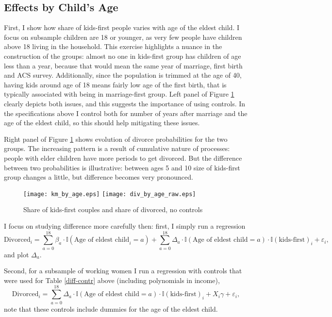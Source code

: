 \documentclass[12pt,letter]{article}
\newcommand{\I}{\mathbb{I}}
\begin{document}
\subsection{Effects by Child's Age}
First, I show how share of kids-first people varies with age of the eldest child. I focus on subsample children are 18 or younger, as very few people have children above 18 living in the household. This exercise highlights a nuance in the construction of the groups: almost no one in kids-first group has children of age less than a year, because that would mean the same year of marriage, first birth and ACS survey. Additionally, since the population is trimmed at the age of 40, having kids around age of 18 means fairly low age of the first birth, that is typically associated with being in marriage-first group. Left panel of Figure \ref{pics-raw} clearly depicts both issues, and this suggests the importance of using controls. In the specifications above I control both for number of years after marriage and the age of the eldest child, so this should help mitigating these issues.

Right panel of Figure \ref{pics-raw} shows evolution of divorce probabilities for the two groups. The increasing pattern is a result of cumulative nature of processes: people with elder children have more periods to get divorced. But the difference between two probabilities is illustrative: between ages 5 and 10 size of kids-first group changes a little, but difference becomes very pronounced.

\begin{figure}[h!]
\texttt{[image: km\_by\_age.eps]}
\texttt{[image: div\_by\_age\_raw.eps]}
\caption{Share of kids-first couples and share of divorced, no controls\label{pics-raw}}
\end{figure}

I focus on studying difference more carefully then: first, I simply run a regression
\[\text{Divorced}_i = \sum_{a=0}^{18} \beta_a \cdot \I(\text{Age of eldest child}_i = a) +  \sum_{a=0}^{18} \Delta_a \cdot \I(\text{Age of eldest child} = a)\cdot \I(\text{kids-first})_i + \varepsilon_i,\]
and plot $\Delta_a$.

Second, for a subsample of working women I run a regression with controls that were used for Table \ref{diff-contr} above (including polynomials in income),
\[\text{Divorced}_i = \sum_{a=0}^{18} \Delta_a \cdot \I(\text{Age of eldest child} = a)\cdot \I(\text{kids-first})_i + X_i\gamma + \varepsilon_i,\]
note that these controls include dummies for the age of the eldest child.
\end{document}
